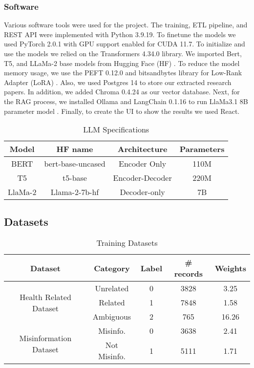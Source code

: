 \subsubsection{Software}
Various software tools were used for the project. The training, ETL pipeline, and REST API were implemented with Python 3.9.19. To finetune the models we used PyTorch 2.0.1 with GPU support enabled for
CUDA 11.7. To initialize and use the models we relied on  the Transformers 4.34.0 library. We imported Bert, T5, and LLaMa-2 base models from Hugging Face (HF) \cite{huggingface}. To reduce the model memory usage, we use the PEFT 0.12.0 and bitsandbytes library for Low-Rank Adapter (LoRA) \cite{hu2021loralowrankadaptationlarge}. Also, we used Postgres 14 to store our extracted research papers. In addition, we added Chroma 0.4.24 as our vector database. Next, for the RAG process, we installed Ollama \cite{ollama} and LangChain 0.1.16 to run LlaMa3.1 8B parameter model \cite{touvron2023llamaopenefficientfoundation}. Finally, to create the UI to show the results we used React.

  \begin{table}[ht!]
\centering
\caption{LLM Specifications}
{\scriptsize
\begin{tabular}{||c | c | c | c||} 
 \hline
\textbf{Model} & \textbf{HF name} & \textbf{Architecture} & \textbf{Parameters} \\
 \hline
 BERT & bert-base-uncased & Encoder Only & 110M \\ 
 \hline
 T5 & t5-base & Encoder-Decoder & 220M \\
 \hline
 LlaMa-2 & Llama-2-7b-hf & Decoder-only & 7B \\
 \hline
\end{tabular}
}
\label{table:LLM}
\end{table}

\subsection{Datasets}

\begin{table}[H]
	\centering
	\caption{Training Datasets}
	{\scriptsize
	\begin{tabular}{||c | c | c | c | c||} 
		\hline
		\textbf{Dataset} &
		\textbf{Category} & \textbf{Label} & \textbf{\# records} & \textbf{Weights} \\
		\hline
		\multirow{3}{6.1em}{Health Related Dataset} & Unrelated & 0 & 3828 & 3.25  \\
		& Related & 1 & 7848 & 1.58  \\ 
		& Ambiguous & 2 & 765 & 16.26 \\
		\hline
		\multirow{2}{6.1em}{Misinformation Dataset} & Misinfo. & 0 & 3638 & 2.41\\ 
		& Not Misinfo. & 1 & 5111 & 1.71 \\
		\hline
	\end{tabular}
	}
	\label{table:dataset}
\end{table}

